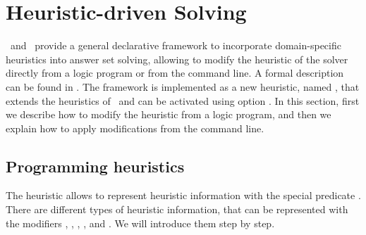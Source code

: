 

\section{Heuristic-driven Solving}
\label{sec:heuristic}


%
%
%

\clasp\ and \clingo\ provide a general declarative framework to incorporate domain-specific heuristics into answer set solving,  
allowing to modify the heuristic of the solver directly from a logic program or from the command line.
A formal description can be found in \cite{gekaotroscwa13a}.
The framework is implemented as a new heuristic, named ,
that extends the  heuristics of \clasp\ 
and can be activated using option .
In this section, 
first we describe how to modify the heuristic from a logic program, 
and then we explain how to apply modifications from the command line.


\subsection{Programming heuristics}

The  heuristic allows to represent heuristic information with the special predicate .
There are different types of heuristic information, 
that can be represented with the modifiers 
, , , ,  and .
We will introduce them step by step.


